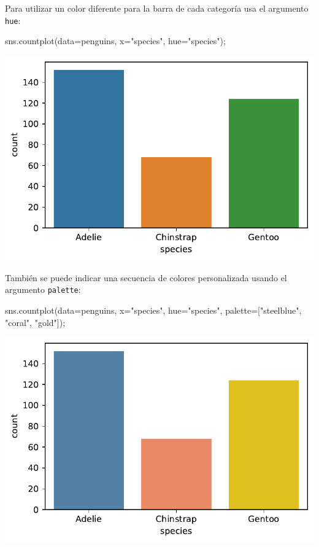 \documentclass[
  a4paper,
  noprof,
  12pt,
  notoc,
  nosols,
  nobib]{mnye}
\newenvironment{Shaded}{\begin{snugshade}}{\end{snugshade}}
\newcommand{\NormalTok}[1]{\textcolor[rgb]{0.00,0.23,0.31}{#1}}
\newcommand{\OperatorTok}[1]{\textcolor[rgb]{0.37,0.37,0.37}{#1}}
\newcommand{\StringTok}[1]{\textcolor[rgb]{0.13,0.47,0.30}{#1}}
\theoremstyle{definition}
\theoremstyle{remark}
\begin{document}
Para utilizar un color diferente para la barra de cada categoría usa el
argumento \texttt{hue}:

\begin{Shaded}
\begin{Highlighting}[]
\NormalTok{sns.countplot(data}\OperatorTok{=}\NormalTok{penguins, x}\OperatorTok{=}\StringTok{"species"}\NormalTok{, hue}\OperatorTok{=}\StringTok{"species"}\NormalTok{)}\OperatorTok{;}
\end{Highlighting}
\end{Shaded}

\includegraphics{chapters/1categorical_files/figure-pdf/cell-9-output-1.pdf}

También se puede indicar una secuencia de colores personalizada usando
el argumento \texttt{palette}:

\begin{Shaded}
\begin{Highlighting}[]
\NormalTok{sns.countplot(data}\OperatorTok{=}\NormalTok{penguins, x}\OperatorTok{=}\StringTok{"species"}\NormalTok{, hue}\OperatorTok{=}\StringTok{"species"}\NormalTok{, palette}\OperatorTok{=}\NormalTok{[}\StringTok{"steelblue"}\NormalTok{, }\StringTok{"coral"}\NormalTok{, }\StringTok{"gold"}\NormalTok{])}\OperatorTok{;}
\end{Highlighting}
\end{Shaded}

\includegraphics{chapters/1categorical_files/figure-pdf/cell-10-output-1.pdf}
\end{document}

